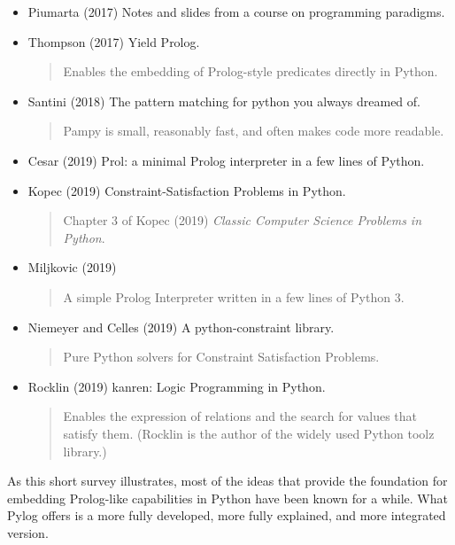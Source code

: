 \begin{itemize}[label=$~$]
\item Piumarta (2017) \cite{Piumarta2017} Notes and slides from a course on programming paradigms.

\item Thompson (2017) \cite{Thompson2017} Yield Prolog.
\begin{quote}
Enables the embedding of Prolog-style predicates directly in Python. \end{quote}

\item Santini (2018) \cite{Santini2018} The pattern matching for python you always dreamed of.
\begin{quote}
Pampy is small, reasonably fast, and often makes code more readable.
\end{quote}

\item Cesar (2019) \cite{Cesar2019} Prol: a minimal Prolog interpreter in a few lines of Python. 

\item Kopec (2019) \cite{Kopec2019} Constraint-Satisfaction Problems in Python.  
\begin{quote} Chapter 3 of Kopec (2019) \textit{Classic Computer Science Problems in Python}.
\end{quote}

\item Miljkovic (2019)\cite{Miljkovic2019} 
\begin{quote}
A simple Prolog Interpreter written in a few lines of Python 3.
\end{quote}

\item Niemeyer and Celles (2019) \cite{Niemeyer2019} A python-constraint library.
\begin{quote}
Pure Python solvers for Constraint Satisfaction Problems.
\end{quote}

\item Rocklin (2019) \cite{Rocklin2019} kanren: Logic Programming in Python.
\begin{quote}
Enables the expression of relations and the search for values that satisfy them. (Rocklin is the author of the widely used Python toolz library.)
\end{quote}

\smallv

\end{itemize}

As this short survey illustrates, most of the ideas that provide the foundation for embedding Prolog-like capabilities in Python have been known for a while. What Pylog offers is a more fully developed, more fully explained, and more integrated version.
